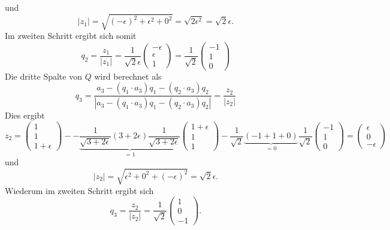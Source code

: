 und
\begin{equation*}
|z_1|=\sqrt{(-\epsilon)^2+\epsilon^2+0^2}=\sqrt{2\epsilon^2}=\sqrt{2}\epsilon.
\end{equation*}
Im zweiten Schritt ergibt sich somit
\begin{equation*}
q_2=\frac{z_1}{|z_1|}=\frac{1}{\sqrt{2}\epsilon}
\begin{pmatrix}
-\epsilon\\
\epsilon\\
1
\end{pmatrix}=
\frac{1}{\sqrt{2}}
\begin{pmatrix}
-1\\
1\\
0
\end{pmatrix}
\end{equation*}
Die dritte Spalte von $Q$ wird berechnet als
\begin{equation*}
q_3=\frac{a_3-(q_1\cdot a_3)q_1-(q_2\cdot a_3)q_2}{|a_3-(q_1\cdot a_3)q_1-(q_2\cdot a_3)q_2|}=\frac{z_2}{|z_2|}
\end{equation*}
Dies ergibt
\begin{equation*}
z_2=
\begin{pmatrix}
1\\
1\\
1+\epsilon
\end{pmatrix}--\underbrace{\frac{1}{\sqrt{3+2\epsilon}}(3+2\epsilon)\frac{1}{\sqrt{3+2\epsilon}}}_{=1}
\begin{pmatrix}
1+\epsilon\\
1\\
1
\end{pmatrix}-\frac{1}{\sqrt{2}}\underbrace{(-1+1+0)}_{=0}\frac{1}{\sqrt{2}}
\begin{pmatrix}
-1\\
1\\
0
\end{pmatrix}=
\begin{pmatrix}
\epsilon\\
0\\
-\epsilon
\end{pmatrix}
\end{equation*}
und
\begin{equation*}
|z_2|=\sqrt{\epsilon^2+0^2+(-\epsilon)^2}=\sqrt{2}\epsilon.
\end{equation*}
Wiederum im zweiten Schritt ergibt sich
\begin{equation*}
q_3=\frac{z_2}{|z_2|}=\frac{1}{\sqrt{2}}
\begin{pmatrix}
1\\
0\\
-1
\end{pmatrix}.
\end{equation*}
